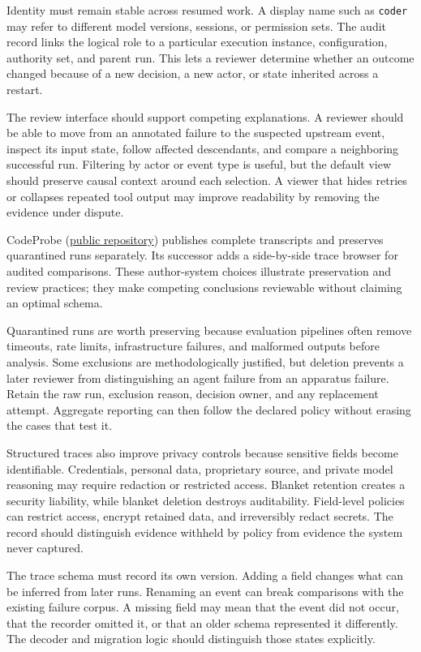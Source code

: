 Identity must remain stable across resumed work. A display name such as \texttt{coder} may refer to different model versions, sessions, or permission sets. The audit record links the logical role to a particular execution instance, configuration, authority set, and parent run. This lets a reviewer determine whether an outcome changed because of a new decision, a new actor, or state inherited across a restart.

The review interface should support competing explanations. A reviewer should be able to move from an annotated failure to the suspected upstream event, inspect its input state, follow affected descendants, and compare a neighboring successful run. Filtering by actor or event type is useful, but the default view should preserve causal context around each selection. A viewer that hides retries or collapses repeated tool output may improve readability by removing the evidence under dispute.

CodeProbe (\href{https://github.com/sjarmak/codeprobe}{public repository}) publishes complete transcripts and preserves quarantined runs separately. Its successor adds a side-by-side trace browser for audited comparisons. These author-system choices illustrate preservation and review practices; they make competing conclusions reviewable without claiming an optimal schema.

Quarantined runs are worth preserving because evaluation pipelines often remove timeouts, rate limits, infrastructure failures, and malformed outputs before analysis. Some exclusions are methodologically justified, but deletion prevents a later reviewer from distinguishing an agent failure from an apparatus failure. Retain the raw run, exclusion reason, decision owner, and any replacement attempt. Aggregate reporting can then follow the declared policy without erasing the cases that test it.

Structured traces also improve privacy controls because sensitive fields become identifiable. Credentials, personal data, proprietary source, and private model reasoning may require redaction or restricted access. Blanket retention creates a security liability, while blanket deletion destroys auditability. Field-level policies can restrict access, encrypt retained data, and irreversibly redact secrets. The record should distinguish evidence withheld by policy from evidence the system never captured.

The trace schema must record its own version. Adding a field changes what can be inferred from later runs. Renaming an event can break comparisons with the existing failure corpus. A missing field may mean that the event did not occur, that the recorder omitted it, or that an older schema represented it differently. The decoder and migration logic should distinguish those states explicitly.

